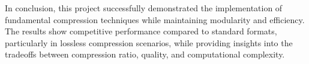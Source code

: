 \documentclass[a4paper,14pt]{article}
\begin{document}
In conclusion, this project successfully demonstrated the implementation of fundamental compression techniques while maintaining modularity and efficiency. The results show competitive performance compared to standard formats, particularly in lossless compression scenarios, while providing insights into the tradeoffs between compression ratio, quality, and computational complexity.
\end{document}
